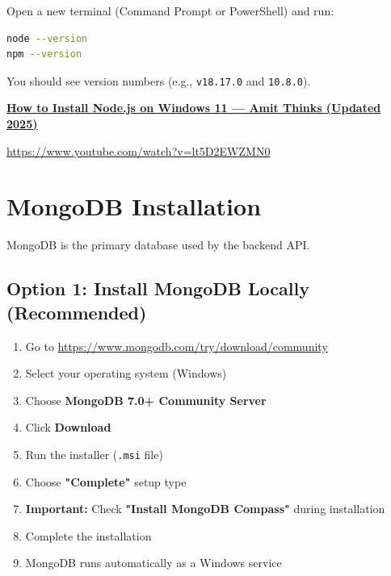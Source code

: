 \documentclass[12pt,a4paper]{article}
\begin{document}
Open a new terminal (Command Prompt or PowerShell) and run:

\begin{lstlisting}[language=bash, caption=Verify Node.js and npm]
node --version
npm --version
\end{lstlisting}

You should see version numbers (e.g., \texttt{v18.17.0} and \texttt{10.8.0}).

\begin{tcolorbox}[colback=infobox,colframe=primaryblue,title= YouTube Tutorial]
    \href{https://www.youtube.com/watch?v=lt5D2EWZMN0}{\textbf{How to Install Node.js on Windows 11 — Amit Thinks (Updated 2025)}}
    
    \url{https://www.youtube.com/watch?v=lt5D2EWZMN0}
\end{tcolorbox}

\newpage

\section{MongoDB Installation}

MongoDB is the primary database used by the backend API.

\subsection{Option 1: Install MongoDB Locally (Recommended)}

\begin{enumerate}[leftmargin=*,itemsep=0.5em]
    \item Go to \url{https://www.mongodb.com/try/download/community}
    \item Select your operating system (Windows)
    \item Choose \textbf{MongoDB 7.0+ Community Server}
    \item Click \textbf{Download}
    \item Run the installer (\texttt{.msi} file)
    \item Choose \textbf{"Complete"} setup type
    \item \textbf{Important:} Check \textbf{"Install MongoDB Compass"} during installation
    \item Complete the installation
    \item MongoDB runs automatically as a Windows service
\end{enumerate}
\end{document}
